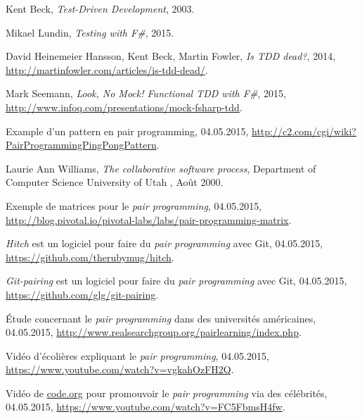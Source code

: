 \documentclass[journal, a4paper, frenchb]{IEEEtran}
\begin{document}
\begin{thebibliography}{1}

Kent Beck, \emph{Test-Driven Development}, 2003.

Mikael Lundin, \emph{Testing with F\#}, 2015.

David Heinemeier Hansson, Kent Beck, Martin Fowler, \emph{Is TDD dead?}, 2014, \url{http://martinfowler.com/articles/is-tdd-dead/}.

Mark Seemann, \emph{Look, No Mock! Functional TDD with F\#}, 2015, \url{http://www.infoq.com/presentations/mock-fsharp-tdd}.

Example d'un pattern en pair programming, 04.05.2015, \url{http://c2.com/cgi/wiki?PairProgrammingPingPongPattern}.

Laurie Ann Williams, \emph{The collaborative software process}, Department of Computer Science University of Utah , Août 2000.

Exemple de matrices pour le \emph{pair programming}, 04.05.2015, \url{http://blog.pivotal.io/pivotal-labs/labs/pair-programming-matrix}.

\emph{Hitch} est un logiciel pour faire du \emph{pair programming} avec Git, 04.05.2015, \url{https://github.com/therubymug/hitch}.

\emph{Git-pairing} est un logiciel pour faire du \emph{pair programming} avec Git, 04.05.2015, \url{https://github.com/glg/git-pairing}.

Étude concernant le \emph{pair programming} dans des universités américaines, 04.05.2015, \url{http://www.realsearchgroup.org/pairlearning/index.php}.

Vidéo d'écolières expliquant le \emph{pair programming}, 04.05.2015, \url{https://www.youtube.com/watch?v=vgkahOzFH2Q}.

Vidéo de \url{code.org} pour promouvoir le \emph{pair programming} via des célébrités, 04.05.2015, \url{https://www.youtube.com/watch?v=FC5FbmsH4fw}.

\end{thebibliography}
\end{document}
